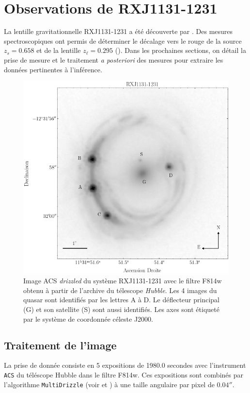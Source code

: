 \documentclass[times,10pt,twocolumn]{article}
\begin{document}
\section{Observations de RXJ1131-1231}
La lentille gravitationnelle RXJ1131-1231 a été découverte par 
\cite{Sluse2003}. Des mesures spectroscopiques ont permis de déterminer le 
décalage vers le rouge de la source $z_s = 0.658$ et de la lentille 
$z_\ell = 0.295$ (\cite{Sluse2003}). Dans les prochaines sections, on détail 
la prise de mesure et le traitement \textit{a posteriori} des mesures pour 
extraire les données pertinentes à l'inférence.
\begin{figure}[H]
        \centering
        \includegraphics[width=\linewidth]{good_cutout}
        \caption{Image ACS \textit{drizzled} du système RXJ1131-1231 avec le filtre F814w obtenu 
                à partir de l'archive du télescope \textit{Hubble}. Les 
        4 images du quasar sont identifiés par les lettres A à D. Le déflecteur principal (G) 
        et son satellite (S) sont aussi identifiés. Les axes sont étiqueté par le système 
        de coordonnée céleste J2000.}
        \label{fig:rxj1131}
\end{figure}

\subsection{Traitement de l'image}
La prise de donnée consiste en 5 expositions de 1980.0 secondes avec 
l'instrument \texttt{ACS} du téléscope Hubble dans le filtre F814w. Ces 
expositions sont combinés par l'algorithme \texttt{MultiDrizzle} 
(voir \cite{Massey2010} et \cite{Koekemoer2007}) à une taille angulaire 
par pixel de $0.04''$.
\end{document}
